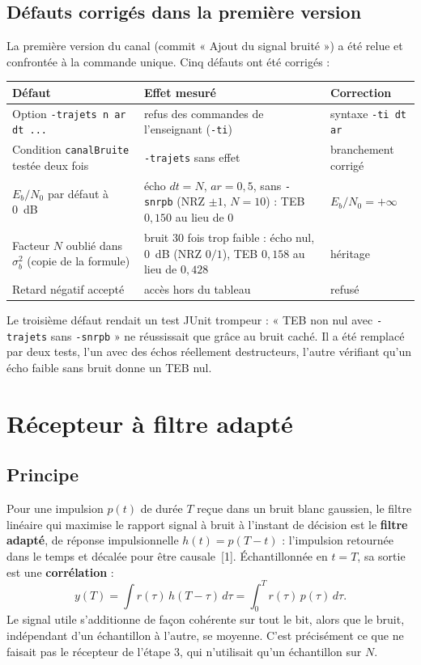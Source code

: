 \documentclass[11pt,a4paper]{article}
\newcommand{\EbNo}{E_b/N_0}
\begin{document}
\subsection{Défauts corrigés dans la première version}
La première version du canal (commit « Ajout du signal bruité ») a été relue et confrontée à la commande unique. Cinq défauts ont été corrigés :
\begin{center}\small\begin{tabularx}{\linewidth}{>{\raggedright\arraybackslash}p{4.3cm}Xl}\toprule
Défaut & Effet mesuré & Correction\\\midrule
Option \texttt{-trajets n ar dt ...} & refus des commandes de l'enseignant (\texttt{-ti}) & syntaxe \texttt{-ti dt ar}\\
Condition \texttt{canalBruite} testée deux fois & \texttt{-trajets} sans effet & branchement corrigé\\
$\EbNo$ par défaut à 0~dB & écho $dt = N$, $ar = 0{,}5$, sans \texttt{-snrpb} (NRZ $\pm1$, $N = 10$) : TEB $0{,}150$ au lieu de 0 & $\EbNo = +\infty$\\
Facteur $N$ oublié dans $\sigma_b^2$ (copie de la formule) & bruit 30 fois trop faible : écho nul, 0~dB (NRZ $0/1$), TEB $0{,}158$ au lieu de $0{,}428$ & héritage\\
Retard négatif accepté & accès hors du tableau & refusé\\\bottomrule
\end{tabularx}\end{center}
Le troisième défaut rendait un test JUnit trompeur : « TEB non nul avec \texttt{-trajets} sans \texttt{-snrpb} » ne réussissait que grâce au bruit caché. Il a été remplacé par deux tests, l'un avec des échos réellement destructeurs, l'autre vérifiant qu'un écho faible sans bruit donne un TEB nul.

\section{Récepteur à filtre adapté}\label{sec:filtre}
\subsection{Principe}
Pour une impulsion $p(t)$ de durée $T$ reçue dans un bruit blanc gaussien, le filtre linéaire qui maximise le rapport signal à bruit à l'instant de décision est le \textbf{filtre adapté}, de réponse impulsionnelle $h(t) = p(T-t)$ : l'impulsion retournée dans le temps et décalée pour être causale~[1]. Échantillonnée en $t = T$, sa sortie est une \textbf{corrélation} :
\[ y(T) = \int r(\tau)\,h(T-\tau)\,d\tau = \int_0^T r(\tau)\,p(\tau)\,d\tau . \]
Le signal utile s'additionne de façon cohérente sur tout le bit, alors que le bruit, indépendant d'un échantillon à l'autre, se moyenne. C'est précisément ce que ne faisait pas le récepteur de l'étape 3, qui n'utilisait qu'un échantillon sur $N$.
\end{document}
